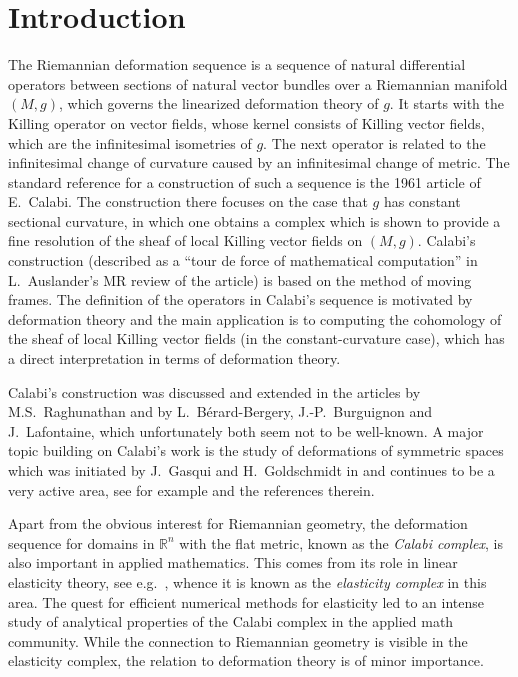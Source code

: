 \documentclass[12pt,a4paper]{amsart}
\def\Bbb{\mathbb}
\numberwithin{theorem}{section}
\numberwithin{equation}{section}
\theoremstyle{definition}
\theoremstyle{remark}
\begin{document}
\section{Introduction}\label{1}
The Riemannian deformation sequence is a sequence of natural differential operators
between sections of natural vector bundles over a Riemannian manifold $(M,g)$, which
governs the linearized deformation theory of $g$. It starts with the Killing operator
on vector fields, whose kernel consists of Killing vector fields, which are the
infinitesimal isometries of $g$. The next operator is related to the infinitesimal
change of curvature caused by an infinitesimal change of metric. The standard
reference for a construction of such a sequence is the 1961 article \cite{Calabi} of
E.\ Calabi. The construction there focuses on the case that $g$ has constant
sectional curvature, in which one obtains a complex which is shown to provide a fine
resolution of the sheaf of local Killing vector fields on $(M,g)$. Calabi's
construction (described as a ``tour de force of mathematical computation'' in
L.\ Auslander's MR review of the article) is based on the method of moving
frames. The definition of the operators in Calabi's sequence is motivated by
deformation theory and the main application is to computing the cohomology of the
sheaf of local Killing vector fields (in the constant-curvature case), which has a
direct interpretation in terms of deformation theory.

Calabi's construction was discussed and extended in the articles \cite{Rag} by
M.S.\ Raghunathan and \cite{BBL} by L.\ B\'erard-Bergery, J.-P.\ Burguignon and
J.\ Lafontaine, which unfortunately both seem not to be well-known. A major topic
building on Calabi's work is the study of deformations of symmetric spaces which was
initiated by J.\ Gasqui and H.\ Goldschmidt in \cite{GG} and continues to be a very
active area, see for example \cite{CELM} and the references therein. 

Apart from the obvious interest for Riemannian geometry, the deformation sequence for
domains in $\Bbb R^n$ with the flat metric, known as the \textit{Calabi complex}, is
also important in applied mathematics. This comes from its role in linear elasticity
theory, see e.g.\ \cite{AFW}, whence it is known as the \textit{elasticity complex}
in this area. The quest for efficient numerical methods for elasticity led to an
intense study of analytical properties of the Calabi complex in the applied math
community. While the connection to Riemannian geometry is visible in the elasticity
complex, the relation to deformation theory is of minor importance.
\end{document}
